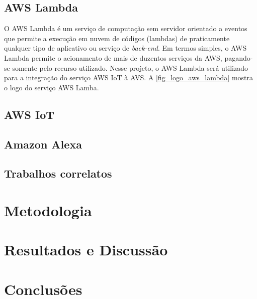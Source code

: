 \documentclass[
    12pt,
    openright,
    twoside,
    a4paper,
    english,
    spanish,
    brazil,
    ]{abntex2}
\begin{document}
\section{AWS Lambda}
O AWS Lambda é um serviço de computação sem servidor orientado a eventos que permite a execução em nuvem de códigos (lambdas) de praticamente qualquer tipo de aplicativo ou serviço de \textit{back-end}. Em termos simples, o AWS Lambda permite o acionamento de mais de duzentos serviços da AWS, pagando-se somente pelo recurso utilizado. Nesse projeto, o AWS Lambda será utilizado para a integração do serviço AWS IoT à AVS. A \autoref{fig_logo_aws_lambda} mostra o logo do serviço AWS Lamba.

\section{AWS IoT}
\section{Amazon Alexa}
\section{Trabalhos correlatos}

\chapter{Metodologia}


\chapter{Resultados e Discussão}

\chapter{Conclusões}

\postextual


\end{document}
